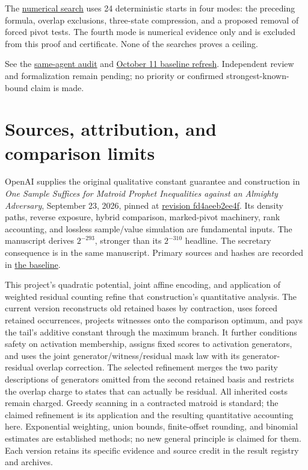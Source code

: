 \documentclass[11pt]{article}
\begin{document}
The \href{https://github.com/shea256/matroid-prophet-inequality/blob/master/experiments/search_support_refinement.py}{numerical search} uses 24 deterministic starts in four modes: the preceding formula, overlap exclusions, three-state compression, and a proposed removal of forced pivot tests. The fourth mode is numerical evidence only and is excluded from this proof and certificate. None of the searches proves a ceiling.

See the \href{https://github.com/shea256/matroid-prophet-inequality/blob/master/proofs/support_refinement_audit.md}{same-agent audit} and \href{https://github.com/shea256/matroid-prophet-inequality/blob/master/verification/support_baseline_audit.json}{October 11 baseline refresh}. Independent review and formalization remain pending; no priority or confirmed strongest-known-bound claim is made.

\section{Sources, attribution, and comparison limits}\label{sources-attribution-and-comparison-limits}

OpenAI supplies the original qualitative constant guarantee and construction in \emph{One Sample Suffices for Matroid Prophet Inequalities against an Almighty Adversary}, September 23, 2026, pinned at \href{https://github.com/openai/math/tree/fd4aeeb2ee4fc729c18d98444fed42fd0529eeeb}{revision fd4aeeb2ee4f}. Its density paths, reverse exposure, hybrid comparison, marked-pivot machinery, rank accounting, and lossless sample/value simulation are fundamental inputs. The manuscript derives \(2^{-293}\), stronger than its \(2^{-310}\) headline. The secretary consequence is in the same manuscript. Primary sources and hashes are recorded in \href{https://github.com/shea256/matroid-prophet-inequality/blob/master/BASELINE.md}{the baseline}.

This project's quadratic potential, joint affine encoding, and application of weighted residual counting refine that construction's quantitative analysis. The current version reconstructs old retained bases by contraction, uses forced retained occurrences, projects witnesses onto the comparison optimum, and pays the tail's additive constant through the maximum branch. It further conditions safety on activation membership, assigns fixed scores to activation generators, and uses the joint generator/witness/residual mask law with its generator-residual overlap correction. The selected refinement merges the two parity descriptions of generators omitted from the second retained basis and restricts the overlap charge to states that can actually be residual. All inherited costs remain charged. Greedy scanning in a contracted matroid is standard; the claimed refinement is its application and the resulting quantitative accounting here. Exponential weighting, union bounds, finite-offset rounding, and binomial estimates are established methods; no new general principle is claimed for them. Each version retains its specific evidence and source credit in the result registry and archives.
\end{document}

